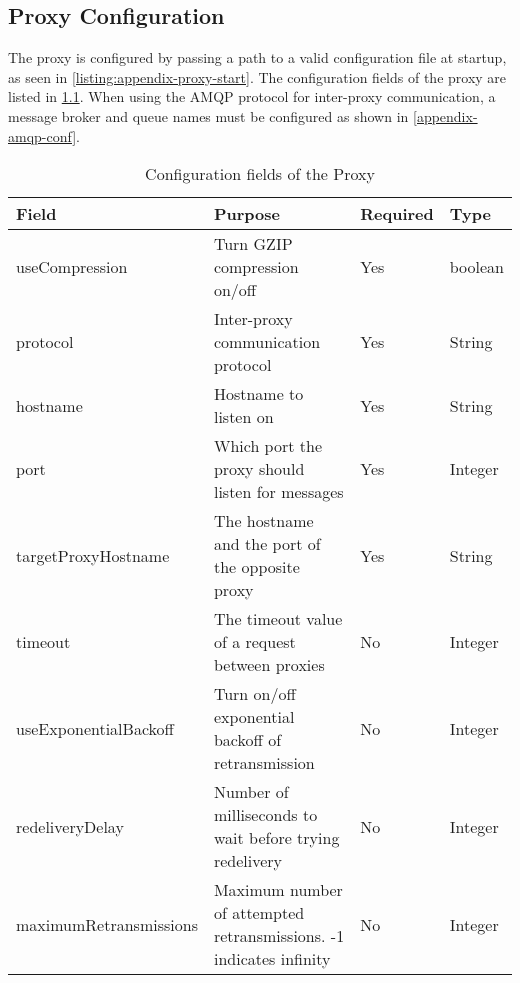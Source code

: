 \begin{appendices}

\chapter{Proxy Configuration}
\label{appendix-config}

The proxy is configured by passing a path to a valid configuration file at
startup, as seen in \cref{listing:appendix-proxy-start}.  The configuration
fields of the proxy are listed in \cref{appendix-table-config}. When using the
AMQP protocol for inter-proxy communication, a message broker and queue names
must be configured as shown in \cref{appendix-amqp-conf}.




\begin{table}[h]
\begin{tabularx}{\textwidth}{|l|X|l|l|}
    \hline
    \textbf{Field}         & \textbf{Purpose}                                                   & \textbf{Required} & \textbf{Type} \\ \hline
    useCompression         & Turn GZIP compression on/off                                       & Yes               & boolean       \\ \hline
    protocol               & Inter-proxy communication protocol                                 & Yes               & String        \\ \hline
    hostname               & Hostname to listen on                                              & Yes               & String        \\ \hline
    port                   & Which port the proxy should listen for messages                    & Yes               & Integer       \\ \hline
    targetProxyHostname    & The hostname and the port of the opposite proxy                    & Yes               & String        \\ \hline
    timeout                & The timeout value of a request between proxies                     & No                & Integer       \\ \hline
    useExponentialBackoff  & Turn on/off exponential backoff of retransmission                 & No                & Integer       \\ \hline
    redeliveryDelay        & Number of milliseconds to wait before trying redelivery            & No                & Integer       \\ \hline
    maximumRetransmissions & Maximum number of attempted retransmissions. -1 indicates infinity & No                & Integer       \\ \hline
\end{tabularx}
\caption{Configuration fields of the Proxy}
\label{appendix-table-config}
\end{table}


\end{appendices}
